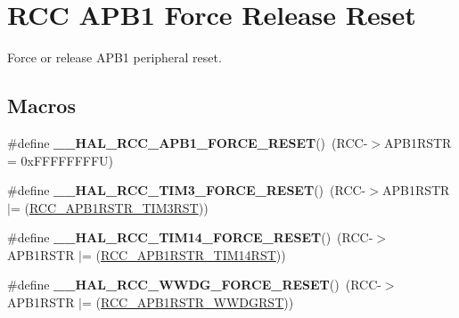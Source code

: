 \hypertarget{group___r_c_c___a_p_b1___force___release___reset}{}\section{R\+CC A\+P\+B1 Force Release Reset}
\label{group___r_c_c___a_p_b1___force___release___reset}


Force or release A\+P\+B1 peripheral reset.  


\subsection*{Macros}
\begin{DoxyCompactItemize}
\item 
\mbox{\label{group___r_c_c___a_p_b1___force___release___reset_ga6f6e7048eca1abd1be132027f5b79465}} 
\#define {\bfseries \+\_\+\+\_\+\+H\+A\+L\+\_\+\+R\+C\+C\+\_\+\+A\+P\+B1\+\_\+\+F\+O\+R\+C\+E\+\_\+\+R\+E\+S\+ET}()~(R\+CC-\/$>$A\+P\+B1\+R\+S\+TR = 0x\+F\+F\+F\+F\+F\+F\+F\+F\+U)
\item 
\mbox{\label{group___r_c_c___a_p_b1___force___release___reset_ga80ff127f3c25bde58ee5c1f224e2dca4}} 
\#define {\bfseries \+\_\+\+\_\+\+H\+A\+L\+\_\+\+R\+C\+C\+\_\+\+T\+I\+M3\+\_\+\+F\+O\+R\+C\+E\+\_\+\+R\+E\+S\+ET}()~(R\+CC-\/$>$A\+P\+B1\+R\+S\+TR $\vert$= (\hyperlink{group___peripheral___registers___bits___definition_ga8680c562fd372b494a160594525d7ce9}{R\+C\+C\+\_\+\+A\+P\+B1\+R\+S\+T\+R\+\_\+\+T\+I\+M3\+R\+ST}))
\item 
\mbox{\label{group___r_c_c___a_p_b1___force___release___reset_gaee5b3b45c9e419c7dc2815fea8ca131f}} 
\#define {\bfseries \+\_\+\+\_\+\+H\+A\+L\+\_\+\+R\+C\+C\+\_\+\+T\+I\+M14\+\_\+\+F\+O\+R\+C\+E\+\_\+\+R\+E\+S\+ET}()~(R\+CC-\/$>$A\+P\+B1\+R\+S\+TR $\vert$= (\hyperlink{group___peripheral___registers___bits___definition_ga773e6d5b419eb2d4b6291c862e04b002}{R\+C\+C\+\_\+\+A\+P\+B1\+R\+S\+T\+R\+\_\+\+T\+I\+M14\+R\+ST}))
\item 
\mbox{\label{group___r_c_c___a_p_b1___force___release___reset_gaf60e74dcb0fdadafd6b4762aa81fc409}} 
\#define {\bfseries \+\_\+\+\_\+\+H\+A\+L\+\_\+\+R\+C\+C\+\_\+\+W\+W\+D\+G\+\_\+\+F\+O\+R\+C\+E\+\_\+\+R\+E\+S\+ET}()~(R\+CC-\/$>$A\+P\+B1\+R\+S\+TR $\vert$= (\hyperlink{group___peripheral___registers___bits___definition_ga0d2591ac0655a8798f4c16cef97e6f94}{R\+C\+C\+\_\+\+A\+P\+B1\+R\+S\+T\+R\+\_\+\+W\+W\+D\+G\+R\+ST}))

\end{DoxyCompactItemize}
